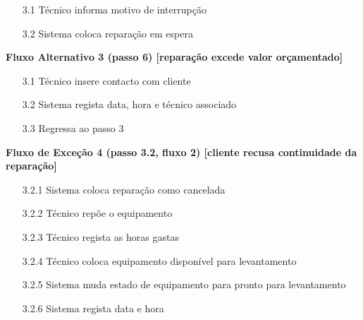 \documentclass[../relatorio.tex]{subfiles}
\begin{document}
\begin{itemize}
          \begin{itemize}
              \item[3.1]{Técnico informa motivo de interrupção}
              \item[3.2]{Sistema coloca reparação em espera}
          \end{itemize}
          \begin{flushleft}
              \textbf{Fluxo Alternativo 3 (passo 6) [reparação excede valor orçamentado]}
          \end{flushleft}
          \begin{itemize}
              \item[3.1]{Técnico insere contacto com cliente}
              \item[3.2]{Sistema regista data, hora e técnico associado}
              \item[3.3]{Regressa ao passo 3}
          \end{itemize}
          \begin{flushleft}
              \textbf{Fluxo de Exceção 4 (passo 3.2, fluxo 2) [cliente recusa continuidade da reparação]}
          \end{flushleft}
          \begin{itemize}
              \item[3.2.1]{Sistema coloca reparação como cancelada}
              \item[3.2.2]{Técnico repõe o equipamento}
              \item[3.2.3]{Técnico regista as horas gastas}
              \item[3.2.4]{Técnico coloca equipamento disponível para levantamento}
              \item[3.2.5]{Sistema muda estado de equipamento para pronto para levantamento}
              \item[3.2.6]{Sistema regista data e hora} 
          \end{itemize}
\end{itemize}
\end{document}
